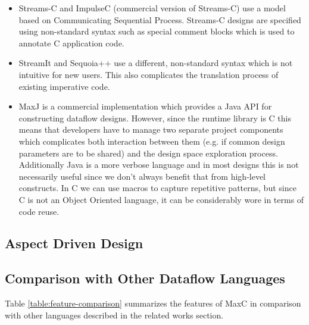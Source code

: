 \begin{itemize}

\item Streams-C\cite{Gokhale:Stone:Arnold:Kalinowski:2000} and
  ImpulseC\cite{ImpulseC} (commercial version of Streams-C) use a model based on
  Communicating Sequential Process. Streams-C designs are specified
  using non-standard syntax such as special comment blocks which is
  used to annotate C application code.

\item StreamIt\cite{Thies:Karczmarek:Amarasinghe:2002} and Sequoia++
  use a different, non-standard syntax which is not intuitive for new
  users. This also complicates the translation process of existing
  imperative code.

\item MaxJ \cite{MaxelerTechnologies:2012} is a commercial
  implementation which provides a Java API for constructing dataflow
  designs. However, since the runtime library is C this means that
  developers have to manage two separate project components which
  complicates both interaction between them (e.g. if common design
  parameters are to be shared) and the design space exploration
  process. Additionally Java is a more verbose language and in most
  designs this is not necessarily useful since we don't always benefit
  that from high-level constructs. In C we can use macros to capture
  repetitive patterns, but since C is not an Object Oriented language,
  it can be considerably wore in terms of code reuse.

\end{itemize}

\subsection{Aspect Driven Design}


\subsection{Comparison with Other Dataflow Languages}

Table \ref{table:feature-comparison} summarizes the features of MaxC
in comparison with other languages described in the related works
section.

